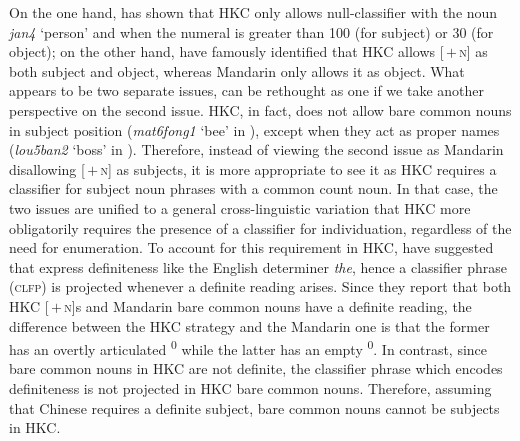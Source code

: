 \documentclass[output=paper]{langsci/langscibook}
\begin{document}
On the one hand,  has shown that \gls{HKC} only allows null-classifier  with the noun
\emph{jan4} ‘person’ and when the numeral is greater than 100 (for subject) or
30 (for object); on the other hand, \citet{ChengSybesma1999} have famously
identified that \gls{HKC} allows [\Clf{}\,$+$\,\textsc{n}]
as both subject and object, whereas Mandarin only allows it as
object.  What appears to be two separate issues, can be rethought as one if we
take another perspective on the second issue. \gls{HKC}, in fact, does not allow bare common nouns in subject position
(\emph{mat6fong1} \enquote*{bee} in ), except when they act as
proper names (\emph{lou5ban2} \enquote*{boss} in ).  Therefore,
instead of viewing the second issue as Mandarin disallowing
[\Clf{}\,$+$\,\textsc{n}] as subjects, it is more appropriate to see it as
\gls{HKC} requires a classifier for
subject noun phrases with a common count noun. In that case, the two issues are
unified to a general cross-linguistic variation that \gls{HKC} more obligatorily requires the presence of a
classifier for individuation, regardless of the need for
enumeration. To account for this requirement in \gls{HKC}, \citet{ChengSybesma1999} have suggested that 
express definiteness like the English determiner \emph{the}, hence a
classifier phrase (\textsc{clfp}) is projected whenever a definite
reading arises. Since they report that both \gls{HKC} [\Clf{}\,$+$\,\textsc{n}]s
and Mandarin bare common nouns have a definite reading, the
difference between the \gls{HKC} strategy and the
Mandarin one is that the former has an overtly articulated
\Clf{}\textsuperscript{0} while the latter has an empty
\Clf{}\textsuperscript{0}. In contrast, since bare common nouns in \gls{HKC}
are not definite, the classifier phrase which encodes
definiteness is not projected in \gls{HKC} bare common
nouns. Therefore, assuming that Chinese requires a definite subject, bare
common nouns cannot be subjects in \gls{HKC}.
\end{document}
